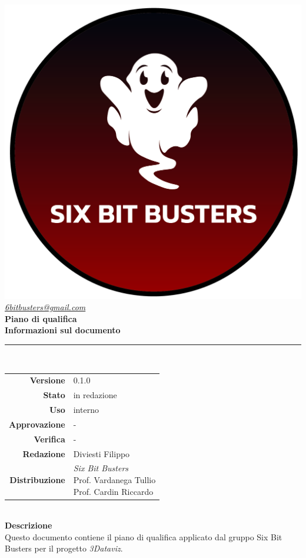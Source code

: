 \thispagestyle{empty}
\renewcommand{\arraystretch}{1.3}


\begin{titlepage}
	\begin{center}
		
	\includegraphics[scale = 0.7]{template/images/logo-circle.png}
	\\[1cm]
	\href{mailto:6bitbusters@gmail.com}		      	
	{\large{\textit{6bitbusters@gmail.com} } }\\[1cm]
	
	\Huge \textbf{Piano di qualifica} \\[1cm]

	\large \textbf{Informazioni sul documento} \\
	\rule{0.6\textwidth}{0.4pt}
	\\[0.5cm]
	\begin{tabular}{r|l}
		\textbf{Versione} & 0.1.0\\
		\textbf{Stato} & in redazione\\
		\textbf{Uso} & interno\\                         
		\textbf{Approvazione} & -\\                      
		\textbf{Verifica} & -\\                         
		\textbf{Redazione} & Diviesti Filippo\\
		\textbf{Distribuzione} & \parbox[t]{5cm}{ \textit{Six Bit Busters} \\ Prof. Vardanega Tullio 
	 \\ Prof. Cardin Riccardo}
	\end{tabular}	
	\\[1.2cm]

	\large \textbf{Descrizione} \\
	Questo documento contiene il piano di qualifica applicato dal gruppo Six Bit Busters
	per il progetto \textit{3Dataviz}.
	
	
	\end{center}
\end{titlepage}
